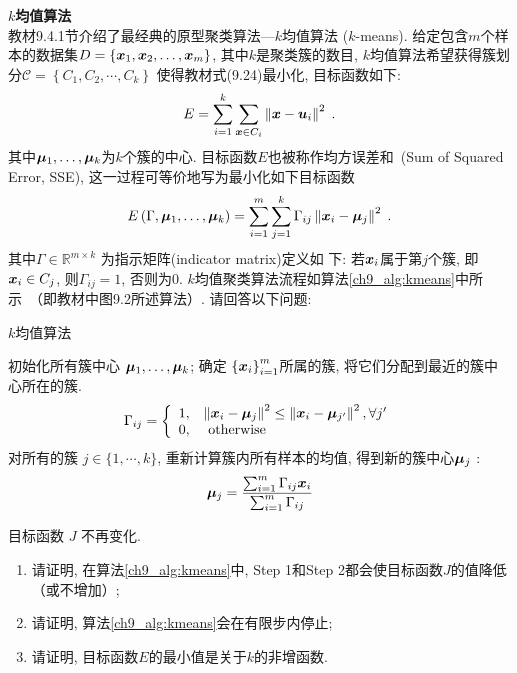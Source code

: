 \documentclass[answers]{exam}  %
\begin{document}
\begin{questions}
\question [20] \textbf{$k$均值算法} \\
\label{ch9_prob:kmeans}
教材9.4.1节介绍了最经典的原型聚类算法---$k$均值算法 ($k$-means). 给定包含$m$个样本的数据集$D =\left\{{\boldsymbol{x}}_{1}, {\boldsymbol{x}}_{2}, \ldots, {\boldsymbol{x}}_{m}\right\}$, 其中$k$是聚类簇的数目, $k$均值算法希望获得簇划分$\mathcal{C}=\left\{C_{1}, C_{2}, \cdots, C_{k}\right\}$
使得教材式(9.24)最小化, 目标函数如下: 
\begin{equation}
 E=\sum_{i=1}^{k}\sum_{{\boldsymbol{x}} \in C_{i}}\left\| {\boldsymbol{x}}-\boldsymbol{u}_{i} \right\|^{2}\;.
\end{equation}
其中$\boldsymbol{\mu}_{1}, \ldots, \boldsymbol{\mu}_{k}$为$k$个簇的中心. 目标函数$E$也被称作均方误差和~(Sum of Squared Error, SSE), 
这一过程可等价地写为最小化如下目标函数
\begin{equation} \label{ch9_kmeans_obj}
E\left({\Gamma}, \boldsymbol{\mu}_{1}, \ldots, \boldsymbol{\mu}_{k}\right)=\sum_{i=1}^{m} \sum_{j=1}^{k} {\Gamma}_{i j}\left\|{\boldsymbol{x}}_{i}-\boldsymbol{\mu}_{j}\right\|^{2}\;.
\end{equation}
其中${\Gamma} \in \mathbb{R}^{m \times k}$ 为指示矩阵(indicator matrix)定义如
下: 若${\boldsymbol{x}}_{i}$属于第$j$个簇, 即${\boldsymbol{x}}_i\in C_j$, 则${\Gamma}_{i j}=1$, 否则为0.
$k$均值聚类算法流程如算法\ref{ch9_alg:kmeans}中所示~（即教材中图9.2所述算法）. 请回答以下问题: 
{\begin{algorithm}[ht]
		\caption{ $k$均值算法 }
		\label{ch9_alg:kmeans}
		\begin{algorithmic}[1]{
				\State 初始化所有簇中心 $\boldsymbol{\mu}_{1}, \ldots, \boldsymbol{\mu}_{k}$;
				\Repeat
				 确定 $\left\{{\boldsymbol{x}}_{i}\right\}_{i=1}^{m}$所属的簇, 将它们分配到最近的簇中心所在的簇.
				\begin{align}{\Gamma}_{i j}=\left\{\begin{array}{ll}
				1, & \left\|{\boldsymbol{x}}_{i}-\boldsymbol{\mu}_{j}\right\|^{2} \leq \left\|{\boldsymbol{x}}_{i}-\boldsymbol{\mu}_{j^{\prime}}\right\|^{2}, \forall j^{\prime} \\
				0, & \text { otherwise }
				\end{array}\right.\end{align} \label{ch9_:step1}
				 对所有的簇 $j \in\{1, \cdots, k\}$, 重新计算簇内所有样本的均值, 得到新的簇中心$\boldsymbol{\mu}_j$  :
			\begin{align}\boldsymbol{\mu}_{j}=\frac{\sum_{i=1}^{m} {\Gamma}_{i j} {\boldsymbol{x}}_{i}}{\sum_{i=1}^{m} {\Gamma}_{i j}}\end{align}	
		
				\Until 目标函数 $J$ 不再变化.}
		\end{algorithmic}
\end{algorithm}}
\begin{enumerate}
    \item 请证明, 在算法\ref{ch9_alg:kmeans}中, Step 1和Step 2都会使目标函数$J$的值降低（或不增加）;
    \item 请证明, 算法\ref{ch9_alg:kmeans}会在有限步内停止;
    \item 请证明, 目标函数$E$的最小值是关于$k$的非增函数.
\end{enumerate}



\end{questions}
\end{document}

